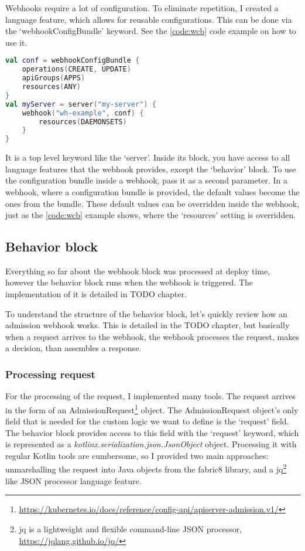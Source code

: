 Webhooks require a lot of configuration. To eliminate repetition, I created a language feature, which allows for reusable configurations. This can be done via the `webhookConfigBundle' keyword. See the \ref{code:wcb} code example on how to use it.

\begin{lstlisting}[caption={Webhook configuration bundle},language=Kotlin,label=code:wcb]
val conf = webhookConfigBundle {
    operations(CREATE, UPDATE)
    apiGroups(APPS)
    resources(ANY)
}
val myServer = server("my-server") {
    webhook("wh-example", conf) {
        resources(DAEMONSETS)
    }
}
\end{lstlisting}

It is a top level keyword like the `server'. Inside its block, you have access to all language features that the webhook provides, except the `behavior' block. To use the configuration bundle inside a webhook, pass it as a second parameter. In a webhook, where a configuration bundle is provided, the default values become the ones from the bundle. These default values can be overridden inside the webhook, just as the \ref{code:wcb} example shows, where the `resources' setting is overridden.

\subsection{Behavior block}

Everything so far about the webhook block was processed at deploy time, however the behavior block runs when the webhook is triggered. The implementation of it is detailed in TODO chapter. 

To understand the structure of the behavior block, let's quickly review how an admission webhook works. This is detailed in the TODO chapter, but basically when a request arrives to the webhook, the webhook processes the request, makes a decision, than assembles a response.

\subsubsection{Processing request}

For the processing of the request, I implemented many tools. The request arrives in the form of an AdmissionRequest\footnote{\url{https://kubernetes.io/docs/reference/config-api/apiserver-admission.v1/}} object. The AdmissionRequest object's only field that is needed for the custom logic we want to define is the `request' field. The behavior block provides access to this field with the `request' keyword, which is represented as a \emph{kotlinx.serialization.json.JsonObject }object. Processing it with regular Kotlin tools are cumbersome, so I provided two main approaches: unmarshalling the request into Java objects from the fabric8 library, and a jq\footnote{jq is a lightweight and flexible command-line JSON processor, \url{https://jqlang.github.io/jq/}} like JSON processor language feature. 

